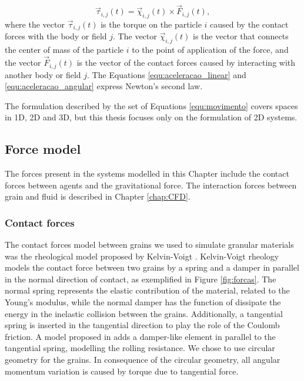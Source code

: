 \begin{equation}
    \label{equ:torque}
    \vec{\tau}_{i,j}(t) = \vec{\chi}_{i,j}(t) \times \vec{F}_{i,j}(t),
\end{equation}
where the vector $\vec{\tau}_{i,j}(t)$ is the torque on the particle $i$ caused by the contact forces with the body or field $j$. The vector $\vec{\chi}_{i,j}(t)$ is the vector that connects the center of mass of the particle $i$ to the point of application of the force, and the vector $\vec{F}_{i,j}(t)$ is the vector of the contact forces caused by interacting with another body or field $j$. The Equations \ref{equ:aceleracao_linear} and \ref{equ:aceleracao_angular} express Newton's second law. 

    The formulation described by the set of Equations \ref{equ:movimento} covers spaces in 1D, 2D and 3D, but this thesis focuses only on the formulation of 2D systems.

\subsection{Force model}
\label{subchap:Modelo_Forcas}
    The forces present in the systems modelled in this Chapter include the contact forces between agents and the gravitational force. The interaction forces between grain and fluid is described in Chapter \ref{chap:CFD}.

\subsubsection{Contact forces}
\label{subsubchap:Reologia}
    The contact forces model between grains we used to simulate granular materials was the rheological model proposed by Kelvin-Voigt \cite{Kelvin, Voigt}. Kelvin-Voigt rheology models the contact force between two grains by a spring and a damper in parallel in the normal direction of contact, as exemplified in Figure \ref{fig:forcas}. The normal spring represents the elastic contribution of the material, related to the Young's modulus, while the normal damper has the function of dissipate the energy in the inelastic collision between the grains. Additionally, a tangential spring is inserted in the tangential direction to play the role of the Coulomb friction. A model proposed in \cite{Caio-Tese} adds a damper-like element in parallel to the tangential spring, modelling the rolling resistance. We chose to use circular geometry for the grains. In consequence of the circular geometry, all angular momentum variation is caused by torque due to tangential force.

